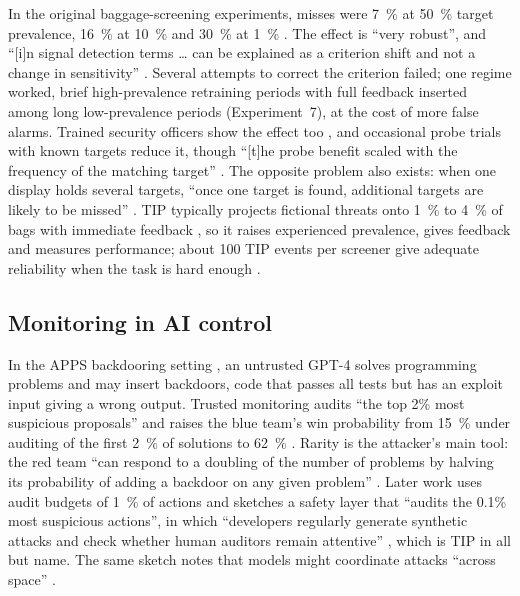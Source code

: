 \documentclass[10pt]{article}
\begin{document}
In the original baggage-screening experiments, misses were \SI{7}{\percent} at \SI{50}{\percent} target prevalence, \SI{16}{\percent} at \SI{10}{\percent} and \SI{30}{\percent} at \SI{1}{\percent} \citep{wolfe2005}. The effect is ``very robust'', and ``[i]n signal detection terms \ldots{} can be explained as a criterion shift and not a change in sensitivity'' \citep[Abstract]{wolfe2007}. Several attempts to correct the criterion failed; one regime worked, brief high-prevalence retraining periods with full feedback inserted among long low-prevalence periods (Experiment~7), at the cost of more false alarms. Trained security officers show the effect too \citep{wolfe2013}, and occasional probe trials with known targets reduce it, though ``[t]he probe benefit scaled with the frequency of the matching target'' \citep[Abstract]{becker2026}. The opposite problem also exists: when one display holds several targets, ``once one target is found, additional targets are likely to be missed'' \citep[Abstract]{cain2013}. TIP typically projects fictional threats onto \SI{1}{\percent} to \SI{4}{\percent} of bags with immediate feedback \citep[Sec.~2]{buser2025}, so it raises experienced prevalence, gives feedback and measures performance; about 100 TIP events per screener give adequate reliability when the task is hard enough \citep[Abstract]{buser2025}.

\subsection{Monitoring in AI control}\label{sec:control}

In the APPS backdooring setting \citep{greenblatt2024}, an untrusted GPT-4 solves programming problems and may insert backdoors, code that passes all tests but has an exploit input giving a wrong output. Trusted monitoring audits ``the top 2\% most suspicious proposals'' and raises the blue team's win probability from \SI{15}{\percent} under auditing of the first \SI{2}{\percent} of solutions to \SI{62}{\percent} \citep[Secs.~3.1.2 and 3.2]{greenblatt2024}. Rarity is the attacker's main tool: the red team ``can respond to a doubling of the number of problems by halving its probability of adding a backdoor on any given problem'' \citep[Sec.~3.1.2]{greenblatt2024}. Later work uses audit budgets of \SI{1}{\percent} of actions \citep[Sec.~2.2]{bhatt2025} and sketches a safety layer that ``audits the 0.1\% most suspicious actions'', in which ``developers regularly generate synthetic attacks and check whether human auditors remain attentive'' \citep[Sec.~4]{korbak2025}, which is TIP in all but name. The same sketch notes that models might coordinate attacks ``across space'' \citep[Sec.~6]{korbak2025}.
\end{document}
